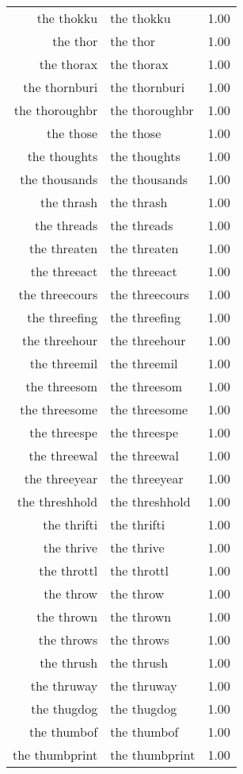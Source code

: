 \begin{table}[ht]
\begin{tabular}{rlr}
  the thokku & the thokku & 1.00 \\ 
  the thor & the thor & 1.00 \\ 
  the thorax & the thorax & 1.00 \\ 
  the thornburi & the thornburi & 1.00 \\ 
  the thoroughbr & the thoroughbr & 1.00 \\ 
  the those & the those & 1.00 \\ 
  the thoughts & the thoughts & 1.00 \\ 
  the thousands & the thousands & 1.00 \\ 
  the thrash & the thrash & 1.00 \\ 
  the threads & the threads & 1.00 \\ 
  the threaten & the threaten & 1.00 \\ 
  the threeact & the threeact & 1.00 \\ 
  the threecours & the threecours & 1.00 \\ 
  the threefing & the threefing & 1.00 \\ 
  the threehour & the threehour & 1.00 \\ 
  the threemil & the threemil & 1.00 \\ 
  the threesom & the threesom & 1.00 \\ 
  the threesome & the threesome & 1.00 \\ 
  the threespe & the threespe & 1.00 \\ 
  the threewal & the threewal & 1.00 \\ 
  the threeyear & the threeyear & 1.00 \\ 
  the threshhold & the threshhold & 1.00 \\ 
  the thrifti & the thrifti & 1.00 \\ 
  the thrive & the thrive & 1.00 \\ 
  the throttl & the throttl & 1.00 \\ 
  the throw & the throw & 1.00 \\ 
  the thrown & the thrown & 1.00 \\ 
  the throws & the throws & 1.00 \\ 
  the thrush & the thrush & 1.00 \\ 
  the thruway & the thruway & 1.00 \\ 
  the thugdog & the thugdog & 1.00 \\ 
  the thumbof & the thumbof & 1.00 \\ 
  the thumbprint & the thumbprint & 1.00 \\ 

\end{tabular}
\end{table}
